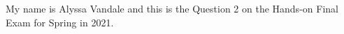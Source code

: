 My name is Alyssa Vandale and this is the Question 2 on the Hands-\/on Final Exam for Spring in 2021. 